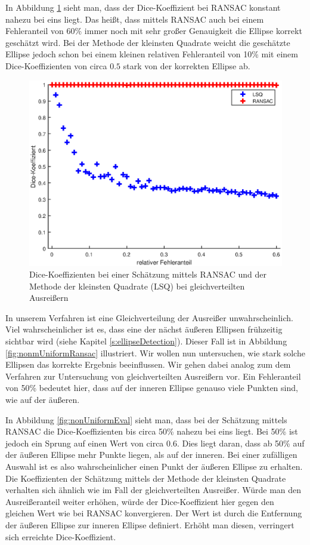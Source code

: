 {In Abbildung \ref{fig:uniformEval} sieht man, dass der Dice-Koeffizient bei RANSAC konstant nahezu bei eins liegt. Das heißt, dass mittels RANSAC auch bei einem Fehleranteil von 60\% immer noch mit sehr großer Genauigkeit die Ellipse korrekt geschätzt wird. Bei der Methode der kleinsten Quadrate weicht die geschätzte Ellipse jedoch schon bei einem kleinen relativen Fehleranteil von 10\% mit einem Dice-Koeffizienten von circa $0.5$ stark von der korrekten Ellipse ab.


\begin{figure}[!htb]
	\centering
	\includegraphics[width=\textwidth]{images/ransacEval0.eps}
	\caption{Dice-Koeffizienten bei einer Schätzung mittels RANSAC und der Methode der kleinsten Quadrate (LSQ) bei gleichverteilten Ausreißern}
	\label{fig:uniformEval}
\end{figure}

In unserem Verfahren ist eine Gleichverteilung der Ausreißer unwahrscheinlich. Viel wahrscheinlicher ist es, dass eine der nächst äußeren Ellipsen frühzeitig sichtbar wird (siehe Kapitel \ref{s:ellipseDetection}).
Dieser Fall ist in Abbildung \ref{fig:nonmUniformRansac} illustriert. Wir wollen nun untersuchen, wie stark solche Ellipsen das korrekte Ergebnis beeinflussen. Wir gehen dabei analog zum dem Verfahren zur Untersuchung von gleichverteilten Ausreißern vor. Ein Fehleranteil von 50\% bedeutet hier, dass auf der inneren Ellipse genauso viele Punkten sind, wie auf der äußeren.

In Abbildung \ref{fig:nonUniformEval} sieht man, dass bei der Schätzung mittels RANSAC die Dice-Koeffizienten bis circa 50\% nahezu bei eins liegt. Bei 50\% ist jedoch ein Sprung auf einen Wert von circa $0.6$. Dies liegt daran, dass ab 50\% auf der äußeren Ellipse mehr Punkte liegen, als auf der inneren. Bei einer zufälligen Auswahl ist es also wahrscheinlicher einen Punkt der äußeren Ellipse zu erhalten. Die Koeffizienten der Schätzung mittels der Methode der kleinsten Quadrate verhalten sich ähnlich wie im Fall der gleichverteilten Ausreißer. Würde man den Ausreißeranteil weiter erhöhen, würde der Dice-Koeffizient hier gegen den gleichen Wert wie bei RANSAC konvergieren. Der Wert ist durch die Entfernung der äußeren Ellipse zur inneren Ellipse definiert. Erhöht man diesen, verringert sich erreichte Dice-Koeffizient.

}
